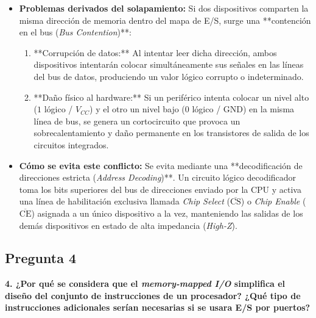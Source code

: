 \documentclass[12pt, letterpaper]{article}
\begin{document}
\begin{itemize}
    \item \textbf{Problemas derivados del solapamiento:}
    Si dos dispositivos comparten la misma dirección de memoria dentro del mapa de E/S, surge una **contención en el bus (\textit{Bus Contention})**:
    \begin{enumerate}
        \item **Corrupción de datos:** Al intentar leer dicha dirección, ambos dispositivos intentarán colocar simultáneamente sus señales en las líneas del bus de datos, produciendo un valor lógico corrupto o indeterminado.
        \item **Daño físico al hardware:** Si un periférico intenta colocar un nivel alto ($1$ lógico / $V_{CC}$) y el otro un nivel bajo ($0$ lógico / GND) en la misma línea de bus, se genera un cortocircuito que provoca un sobrecalentamiento y daño permanente en los transistores de salida de los circuitos integrados.
    \end{enumerate}
    
    \item \textbf{Cómo se evita este conflicto:}
    Se evita mediante una **decodificación de direcciones estricta (\textit{Address Decoding})**. Un circuito lógico decodificador toma los bits superiores del bus de direcciones enviado por la CPU y activa una línea de habilitación exclusiva llamada \textit{Chip Select} ($\overline{\text{CS}}$) o \textit{Chip Enable} ($\overline{\text{CE}}$) asignada a un único dispositivo a la vez, manteniendo las salidas de los demás dispositivos en estado de alta impedancia (\textit{High-Z}).
\end{itemize}

\hr

\subsection*{Pregunta 4}
\textbf{4. ¿Por qué se considera que el \textit{memory-mapped I/O} simplifica el diseño del conjunto de instrucciones de un procesador? ¿Qué tipo de instrucciones adicionales serían necesarias si se usara E/S por puertos?}
\end{document}
